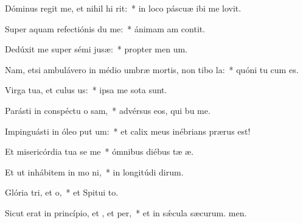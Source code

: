 \item Dóminus regit me, et nihil hi rit:~* in loco páscuæ ibi me lovit.
\item Super aquam refectiónis du me:~* ánimam am contit.
\item Dedúxit me super sémi jusæ:~* propter men um.
\item Nam, etsi ambulávero in médio umbræ mortis, non tibo la:~* quóni tu cum es.
\item Virga tua, et culus us:~* ipsa me sota sunt.
\item Parásti in conspéctu o sam,~* advérsus eos, qui bu me.
\item Impinguásti in óleo put um:~* et calix meus inébrians  prærus est!
\item Et misericórdia tua se me~* ómnibus diébus tæ æ.
\item Et ut inhábitem in mo ni,~* in longitúdi dirum.
\item Glória tri, et o,~* et Spitui to.
\item Sicut erat in princípio, et , et per,~* et in sǽcula sæcurum. men.
